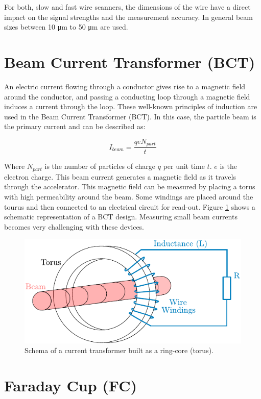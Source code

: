 For both, slow and fast wire scanners, the dimensions of the wire have a direct impact on the signal strengths and the measurement accuracy. In general beam sizes between 10 \si[]{\micro \metre} to 50 \si[]{\micro \metre}  are used.

\section{Beam Current Transformer (BCT)}
\label{sec:BCT}

An electric current flowing through a conductor gives rise to a magnetic field around the conductor, and passing a conducting loop through a magnetic field induces a current through the loop. These well-known principles of induction are used in the Beam Current Transformer (BCT). In this case, the particle beam is the primary current and can be described as: 

\begin{equation}
    I_{beam} = \frac{q e N_{part}}{t}
\end{equation}

Where $N_{part}$ is the number of particles of charge $q$ per unit time $t$. $e$ is the electron charge. This beam current generates a magnetic field as it travels through the accelerator. This magnetic field can be measured by placing a torus with high permeability around the beam. Some windings are placed around the tourus and then connected to an electrical circuit for read-out. Figure \ref{fig:BCTschema} shows a schematic representation of a BCT design. Measuring small beam currents becomes very challenging with these devices.

\begin{figure}[h]
    \centering
    \includegraphics[width=0.6\columnwidth]{BCTschema/BCTschema.pdf}
    \caption{Schema of a current transformer built as a ring-core (torus). }
    \label{fig:BCTschema}
\end{figure}

\section{Faraday Cup (FC)}
\label{sec:FC}

